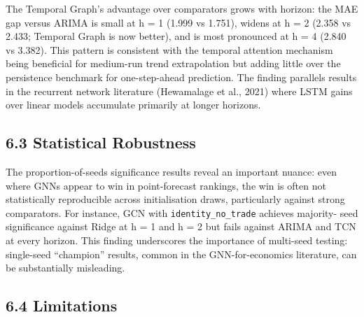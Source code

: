 \documentclass[
  11pt,
  a4paper]{article}
\begin{document}
The Temporal Graph's advantage over comparators grows with horizon: the
MAE gap versus ARIMA is small at h = 1 (1.999 vs 1.751), widens at h = 2
(2.358 vs 2.433; Temporal Graph is now better), and is most pronounced
at h = 4 (2.840 vs 3.382). This pattern is consistent with the temporal
attention mechanism being beneficial for medium-run trend extrapolation
but adding little over the persistence benchmark for one-step-ahead
prediction. The finding parallels results in the recurrent network
literature (Hewamalage et al., 2021) where LSTM gains over linear models
accumulate primarily at longer horizons.

\subsection{6.3 Statistical Robustness}\label{statistical-robustness}

The proportion-of-seeds significance results reveal an important nuance:
even where GNNs appear to win in point-forecast rankings, the win is
often not statistically reproducible across initialisation draws,
particularly against strong comparators. For instance, GCN with
\texttt{identity\_no\_trade} achieves majority- seed significance
against Ridge at h = 1 and h = 2 but fails against ARIMA and TCN at
every horizon. This finding underscores the importance of multi-seed
testing: single-seed ``champion'' results, common in the
GNN-for-economics literature, can be substantially misleading.

\subsection{6.4 Limitations}\label{limitations}
\end{document}
